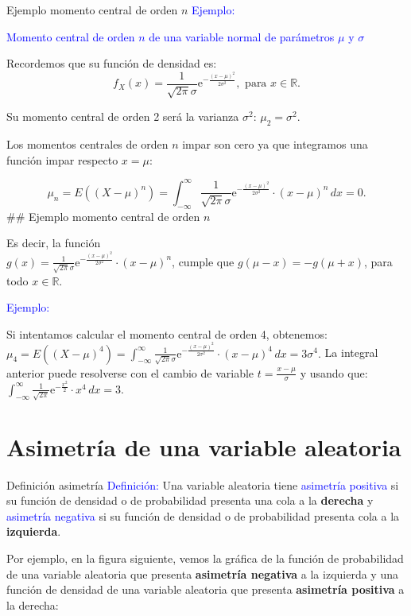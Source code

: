 \documentclass[
  ignorenonframetext,
  aspectratio=169]{beamer}
\newcommand\blue[1]{\textcolor{blue}{#1}}
\begin{document}
\begin{frame}{Ejemplo momento central de orden \(n\)}
\protect\hypertarget{ejemplo-momento-central-de-orden-n-3}{}
\blue{Ejemplo:}

\blue{Momento central de orden $n$ de una variable normal de parámetros $\mu$ y $\sigma$}

Recordemos que su función de densidad es:
\[f_X(x)=\frac{1}{\sqrt{2\pi}\sigma}\mathrm{e}^{-\frac{(x-\mu)^2}{2\sigma^2}},\mbox{ para }  x\in \mathbb{R}.\]

Su momento central de orden 2 será la varianza \(\sigma^2\):
\(\mu_2 =\sigma^2.\)

Los momentos centrales de orden \(n\) impar son cero ya que integramos
una función impar respecto \(x=\mu\):

\[\mu_n = E\left((X-\mu)^n\right)=\int_{-\infty}^\infty \frac{1}{\sqrt{2\pi}\sigma}\mathrm{e}^{-\frac{(x-\mu)^2}{2\sigma^2}}\cdot (x-\mu)^n\, dx = 0.\]
\#\# Ejemplo momento central de orden \(n\)

Es decir, la función\\
\(g(x)=\frac{1}{\sqrt{2\pi}\sigma}\mathrm{e}^{-\frac{(x-\mu)^2}{2\sigma^2}}\cdot (x-\mu)^n\),
cumple que \(g(\mu-x)=-g(\mu +x)\), para todo \(x\in\mathbb{R}\).

\blue{Ejemplo:}

Si intentamos calcular el momento central de orden 4, obtenemos:
\(\mu_4 = E\left((X-\mu)^4\right)=\int_{-\infty}^\infty \frac{1}{\sqrt{2\pi}\sigma}\mathrm{e}^{-\frac{(x-\mu)^2}{2\sigma^2}}\cdot (x-\mu)^4\, dx = 3\sigma^4.\)
La integral anterior puede resolverse con el cambio de variable
\(t=\frac{x-\mu}{\sigma}\) y usando que:
\(\int_{-\infty}^\infty \frac{1}{\sqrt{2\pi}}\mathrm{e}^{-\frac{x^2}{2}}\cdot x^4\, dx = 3.\)
\end{frame}

\hypertarget{asimetruxeda-de-una-variable-aleatoria}{%
\section{Asimetría de una variable
aleatoria}\label{asimetruxeda-de-una-variable-aleatoria}}

\begin{frame}{Definición asimetría}
\protect\hypertarget{definiciuxf3n-asimetruxeda}{}
\blue{Definición:} Una variable aleatoria tiene
\blue{asimetría positiva} si su función de densidad o de probabilidad
presenta una cola a la \textbf{derecha} y \blue{asimetría negativa} si
su función de densidad o de probabilidad presenta cola a la
\textbf{izquierda}.

Por ejemplo, en la figura siguiente, vemos la gráfica de la función de
probabilidad de una variable aleatoria que presenta \textbf{asimetría
negativa} a la izquierda y una función de densidad de una variable
aleatoria que presenta \textbf{asimetría positiva} a la derecha:
\end{frame}
\end{document}
